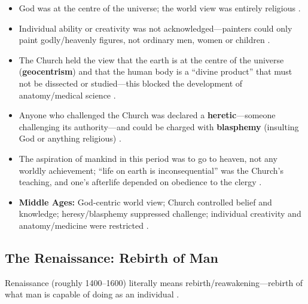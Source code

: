 \begin{KeyConcept}
\begin{itemize}
    \item God was at the centre of the universe; the world view was entirely religious .
    \item Individual ability or creativity was not acknowledged---painters could only paint godly/heavenly figures, not ordinary men, women or children .
    \item The Church held the view that the earth is at the centre of the universe (\textbf{geocentrism}) and that the human body is a ``divine product'' that must not be dissected or studied---this blocked the development of anatomy/medical science .
    \item Anyone who challenged the Church was declared a \textbf{heretic}---someone challenging its authority---and could be charged with \textbf{blasphemy} (insulting God or anything religious) .
    \item The aspiration of mankind in this period was to go to heaven, not any worldly achievement; ``life on earth is inconsequential'' was the Church's teaching, and one's afterlife depended on obedience to the clergy .
\end{itemize}
\end{KeyConcept}

\begin{QuickRevision}
\begin{itemize}
    \item \textbf{Middle Ages:} God-centric world view; Church controlled belief and knowledge; heresy/blasphemy suppressed challenge; individual creativity and anatomy/medicine were restricted .
\end{itemize}
\end{QuickRevision}

\subsection{The Renaissance: Rebirth of Man}
Renaissance (roughly 1400--1600) literally means rebirth/reawakening---rebirth of what man is capable of doing as an individual .

